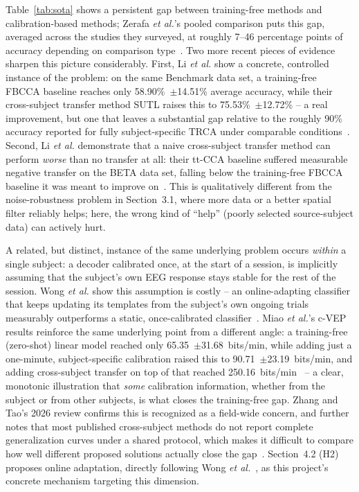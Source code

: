 \documentclass[11pt]{article}
\begin{document}
Table~\ref{tab:sota} shows a persistent gap between training-free methods and calibration-based methods; Zerafa \textit{et al.}'s pooled comparison puts this gap, averaged across the studies they surveyed, at roughly 7--46 percentage points of accuracy depending on comparison type~\cite{zerafa2018train}. Two more recent pieces of evidence sharpen this picture considerably. First, Li \textit{et al.} show a concrete, controlled instance of the problem: on the same Benchmark data set, a training-free FBCCA baseline reaches only 58.90\%~$\pm$14.51\% average accuracy, while their cross-subject transfer method SUTL raises this to 75.53\%~$\pm$12.72\% -- a real improvement, but one that leaves a substantial gap relative to the roughly 90\% accuracy reported for fully subject-specific TRCA under comparable conditions~\cite{li2024sutl,nakanishi2018trca}. Second, Li \textit{et al.} demonstrate that a naive cross-subject transfer method can perform \emph{worse} than no transfer at all: their tt-CCA baseline suffered measurable negative transfer on the BETA data set, falling below the training-free FBCCA baseline it was meant to improve on~\cite{li2024sutl}. This is qualitatively different from the noise-robustness problem in Section~3.1, where more data or a better spatial filter reliably helps; here, the wrong kind of ``help'' (poorly selected source-subject data) can actively hurt.

A related, but distinct, instance of the same underlying problem occurs \emph{within} a single subject: a decoder calibrated once, at the start of a session, is implicitly assuming that the subject's own EEG response stays stable for the rest of the session. Wong \textit{et al.} show this assumption is costly -- an online-adapting classifier that keeps updating its templates from the subject's own ongoing trials measurably outperforms a static, once-calibrated classifier~\cite{wong2022onlineadaptation}. Miao \textit{et al.}'s c-VEP results reinforce the same underlying point from a different angle: a training-free (zero-shot) linear model reached only 65.35~$\pm$31.68~bits/min, while adding just a one-minute, subject-specific calibration raised this to 90.71~$\pm$23.19~bits/min, and adding cross-subject transfer on top of that reached 250.16~bits/min~\cite{miao2024cvepminimal} -- a clear, monotonic illustration that \emph{some} calibration information, whether from the subject or from other subjects, is what closes the training-free gap. Zhang and Tao's 2026 review confirms this is recognized as a field-wide concern, and further notes that most published cross-subject methods do not report complete generalization curves under a shared protocol, which makes it difficult to compare how well different proposed solutions actually close the gap~\cite{zhang2026mobilereview}. Section~4.2 (H2) proposes online adaptation, directly following Wong \textit{et al.}~\cite{wong2022onlineadaptation}, as this project's concrete mechanism targeting this dimension.
\end{document}
